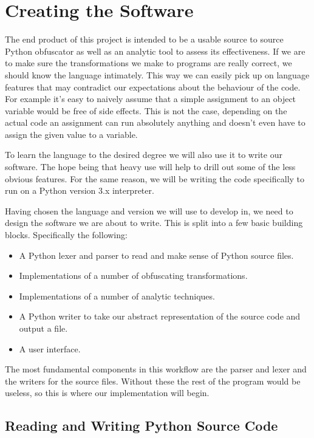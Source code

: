 \documentclass[twoside,a4paper]{report}
\begin{document}
\section{Creating the Software}

The end product of this project is intended to be a usable source to source Python obfuscator as well as an analytic tool
to assess its effectiveness. If we are to make sure the transformations we make to programs are really correct, we should
know the language intimately. This way we can easily pick up on language features that may contradict our
expectations about the behaviour of the code. For example it's easy to naively assume that a simple assignment to an object
variable would be free of side effects. This is not the case, depending on the actual code an assignment can run absolutely
anything \cite{pyprop} and doesn't even have to assign the given value to a variable.

To learn the language to the desired degree we will also use it to write our software. The hope being that heavy use will help to
drill out some of the less obvious features. For the same reason, we will be writing the code specifically to run on a Python version 3.x
interpreter.

Having chosen the language and version we will use to develop in, we need to design the software we are about to write. This is split into a few basic building
blocks. Specifically the following:

\begin{itemize}
\item A Python lexer and parser to read and make sense of Python source files.
\item Implementations of a number of obfuscating transformations.
\item Implementations of a number of analytic techniques.
\item A Python writer to take our abstract representation of the source code and output a file.
\item A user interface.
\end{itemize}

The most fundamental components in this workflow are the parser and lexer and the writers for the source files.
Without these the rest of the program would be useless, so this is where our implementation will begin.

\subsection{Reading and Writing Python Source Code}
\end{document}
